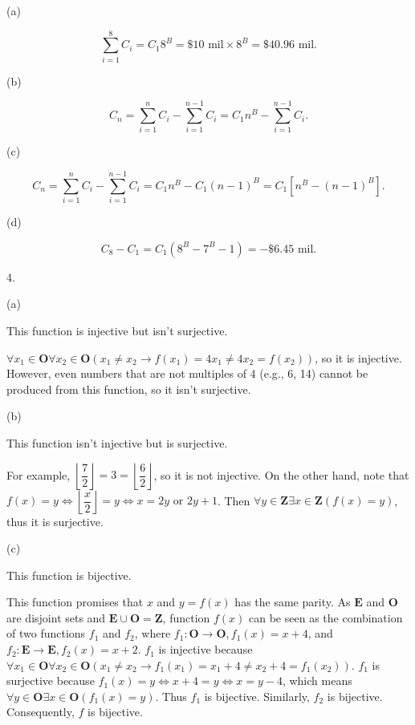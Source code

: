\documentclass[UTF8,12pt,letterpaper,oneside]{amsart}
\begin{document}
(a)

$$\sum_{i = 1}^8 C_i = C_1 8^B = \$10\text{ mil} \times 8^B = \$40.96\text{ mil}.$$

(b)

$$C_n = \sum_{i = 1}^{n} C_i - \sum_{i = 1}^{n - 1} C_i  = C_1 n^B - \sum_{i = 1}^{n - 1} C_i.$$

(c)

$$C_n = \sum_{i = 1}^{n} C_i - \sum_{i = 1}^{n - 1} C_i = C_1 n^B - C_1 (n - 1)^B = C_1 \left[ n^B - (n - 1)^B \right].$$

(d)

$$C_8 - C_1 = C_1 \left ( 8^B - 7^B - 1\right ) = -\$6.45\text{ mil}.$$

4. 

(a) 

This function is injective but isn't surjective. 

$\forall x_1 \in \mathbf{O} \forall x_2 \in \mathbf{O}(x_1 \neq x_2 \rightarrow f(x_1) = 4x_1 \neq 4x_2 = f(x_2))$, so it is injective.
However, even numbers that are not multiples of 4 (e.g., 6, 14) cannot be produced from this function, so it isn't surjective.

(b) 

This function isn't injective but is surjective. 

For example, $\left \lfloor \dfrac{7}{2} \right \rfloor = 3 = \left \lfloor \dfrac{6}{2} \right \rfloor$, so it is not injective. On the other hand, note that $f(x) = y \Leftrightarrow \left \lfloor \dfrac{x}{2} \right \rfloor = y \Leftrightarrow x = 2y \text{ or } 2y + 1$. Then $\forall y \in \mathbf{Z} \exists x \in \mathbf{Z} (f(x) = y)$, thus it is surjective.

(c) 

This function is bijective.

This function promises that $x$ and $y = f(x)$ has the same parity. As $\mathbf{E}$ and $\mathbf{O}$ are disjoint sets and $\mathbf{E} \cup \mathbf{O} = \mathbf{Z}$, function $f(x)$ can be seen as the combination of two functions $f_1$ and $f_2$, where $f_1: \mathbf{O} \rightarrow \mathbf{O}, f_1(x) = x + 4$, and $f_2: \mathbf{E} \rightarrow \mathbf{E}, f_2(x) = x + 2$. $f_1$ is injective because $\forall x_1 \in \mathbf{O} \forall x_2 \in \mathbf{O}(x_1 \neq x_2 \rightarrow f_1(x_1) = x_1 + 4 \neq x_2 + 4 = f_1(x_2))$. $f_1$ is surjective because $f_1(x) = y \Leftrightarrow x + 4 = y \Leftrightarrow x = y - 4$, which means $\forall y \in \mathbf{O} \exists x \in \mathbf{O} (f_1(x) = y)$. Thus $f_1$ is bijective. Similarly, $f_2$ is bijective. Consequently, $f$ is bijective.
\end{document}
